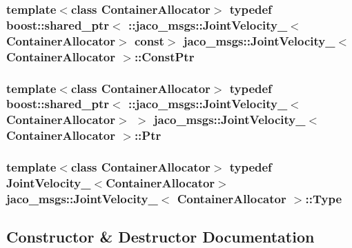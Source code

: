 \subsubsection[{\texorpdfstring{Const\+Ptr}{ConstPtr}}]{\setlength{\rightskip}{0pt plus 5cm}template$<$class Container\+Allocator$>$ typedef boost\+::shared\+\_\+ptr$<$ \+::{\bf jaco\+\_\+msgs\+::\+Joint\+Velocity\+\_\+}$<$Container\+Allocator$>$ const$>$ {\bf jaco\+\_\+msgs\+::\+Joint\+Velocity\+\_\+}$<$ Container\+Allocator $>$\+::{\bf Const\+Ptr}}\hypertarget{structjaco__msgs_1_1JointVelocity___a16e3f55bcdaff368c588945f63478858}{}\label{structjaco__msgs_1_1JointVelocity___a16e3f55bcdaff368c588945f63478858}
\subsubsection[{\texorpdfstring{Ptr}{Ptr}}]{\setlength{\rightskip}{0pt plus 5cm}template$<$class Container\+Allocator$>$ typedef boost\+::shared\+\_\+ptr$<$ \+::{\bf jaco\+\_\+msgs\+::\+Joint\+Velocity\+\_\+}$<$Container\+Allocator$>$ $>$ {\bf jaco\+\_\+msgs\+::\+Joint\+Velocity\+\_\+}$<$ Container\+Allocator $>$\+::{\bf Ptr}}\hypertarget{structjaco__msgs_1_1JointVelocity___abfcfdd60981037c03b85fd7ed2989df2}{}\label{structjaco__msgs_1_1JointVelocity___abfcfdd60981037c03b85fd7ed2989df2}
\subsubsection[{\texorpdfstring{Type}{Type}}]{\setlength{\rightskip}{0pt plus 5cm}template$<$class Container\+Allocator$>$ typedef {\bf Joint\+Velocity\+\_\+}$<$Container\+Allocator$>$ {\bf jaco\+\_\+msgs\+::\+Joint\+Velocity\+\_\+}$<$ Container\+Allocator $>$\+::{\bf Type}}\hypertarget{structjaco__msgs_1_1JointVelocity___a09ae16ebc5eec5d6a7f20405ab791467}{}\label{structjaco__msgs_1_1JointVelocity___a09ae16ebc5eec5d6a7f20405ab791467}


\subsection{Constructor \& Destructor Documentation}

